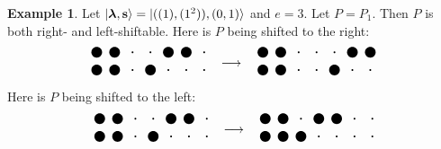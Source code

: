 \documentclass[12pt]{amsart}
\numberwithin{equation}{section}
\theoremstyle{definition}
\newtheorem{example}[equation]{Example}
\newcommand\TikZ[1]{\begin{matrix}\begin{tikzpicture}#1\end{tikzpicture}\end{matrix}}
\newcommand{\mbs}{\mathbf{s}}
\begin{document}
 \begin{example}
 Let $|\bla,\mbs\rangle=|((1),(1^2)),(0,1)\rangle$ and $e=3$. Let $P=P_1$. Then  $P$ is both right- and left-shiftable. Here is $P$ being shifted to the right:
 $$
 \TikZ{[scale=.5]
 \draw
 (0,0)node[fill,circle,inner sep=3pt]{}
 (1,0)node[fill,circle,inner sep=3pt]{}
 (2,0)node[fill,circle,inner sep=.5pt]{}
 (3,0)node[fill,circle,inner sep=3pt]{}
 (4,0)node[fill,circle,inner sep=.5pt]{}
 (5,0)node[fill,circle,inner sep=.5pt]{}
 (6,0)node[fill,circle,inner sep=.5pt]{}
 (0,1)node[fill,circle,inner sep=3pt]{}
 (1,1)node[fill,circle,inner sep=3pt]{}
 (2,1)node[fill,circle,inner sep=.5pt]{}
 (3,1)node[fill,circle,inner sep=.5pt]{}
 (4,1)node[fill,circle,inner sep=3pt]{}
 (5,1)node[fill,circle,inner sep=3pt]{}
 (6,1)node[fill,circle,inner sep=.5pt]{}
 ;}
 \quad
 \longrightarrow
 \quad
 \TikZ{[scale=.5]
 \draw
 (0,0)node[fill,circle,inner sep=3pt]{}
 (1,0)node[fill,circle,inner sep=3pt]{}
 (2,0)node[fill,circle,inner sep=.5pt]{}
 (3,0)node[fill,circle,inner sep=.5pt]{}
 (4,0)node[fill,circle,inner sep=3pt]{}
 (5,0)node[fill,circle,inner sep=.5pt]{}
 (6,0)node[fill,circle,inner sep=.5pt]{}
 (0,1)node[fill,circle,inner sep=3pt]{}
 (1,1)node[fill,circle,inner sep=3pt]{}
 (2,1)node[fill,circle,inner sep=.5pt]{}
 (3,1)node[fill,circle,inner sep=.5pt]{}
 (4,1)node[fill,circle,inner sep=.5pt]{}
 (5,1)node[fill,circle,inner sep=3pt]{}
 (6,1)node[fill,circle,inner sep=3pt]{}
 ;}
 $$
 Here is $P$ being shifted to the left:
 $$
 \TikZ{[scale=.5]
 \draw
 (0,0)node[fill,circle,inner sep=3pt]{}
 (1,0)node[fill,circle,inner sep=3pt]{}
 (2,0)node[fill,circle,inner sep=.5pt]{}
 (3,0)node[fill,circle,inner sep=3pt]{}
 (4,0)node[fill,circle,inner sep=.5pt]{}
 (5,0)node[fill,circle,inner sep=.5pt]{}
 (6,0)node[fill,circle,inner sep=.5pt]{}
 (0,1)node[fill,circle,inner sep=3pt]{}
 (1,1)node[fill,circle,inner sep=3pt]{}
 (2,1)node[fill,circle,inner sep=.5pt]{}
 (3,1)node[fill,circle,inner sep=.5pt]{}
 (4,1)node[fill,circle,inner sep=3pt]{}
 (5,1)node[fill,circle,inner sep=3pt]{}
 (6,1)node[fill,circle,inner sep=.5pt]{}
 ;}
 \quad
 \longrightarrow
 \quad
 \TikZ{[scale=.5]
 \draw
 (0,0)node[fill,circle,inner sep=3pt]{}
 (1,0)node[fill,circle,inner sep=3pt]{}
 (2,0)node[fill,circle,inner sep=3pt]{}
 (3,0)node[fill,circle,inner sep=.5pt]{}
 (4,0)node[fill,circle,inner sep=.5pt]{}
 (5,0)node[fill,circle,inner sep=.5pt]{}
 (6,0)node[fill,circle,inner sep=.5pt]{}
 (0,1)node[fill,circle,inner sep=3pt]{}
 (1,1)node[fill,circle,inner sep=3pt]{}
 (2,1)node[fill,circle,inner sep=.5pt]{}
 (3,1)node[fill,circle,inner sep=3pt]{}
 (4,1)node[fill,circle,inner sep=3pt]{}
 (5,1)node[fill,circle,inner sep=.5pt]{}
 (6,1)node[fill,circle,inner sep=.5pt]{}
 ;}
 $$
 \end{example}
 
\end{document}
